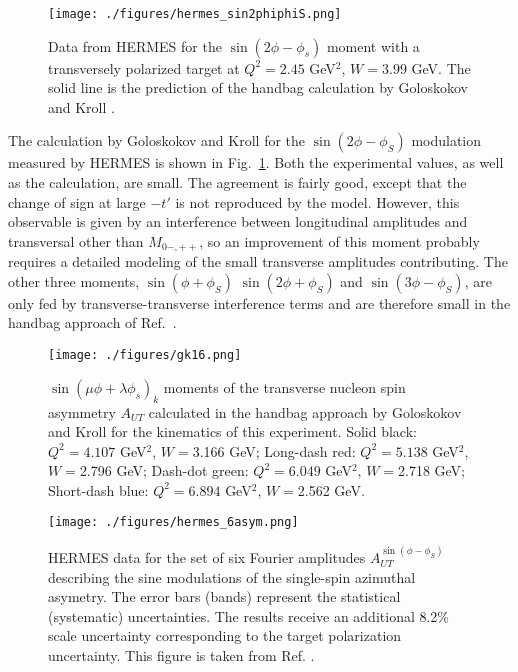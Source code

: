 \begin{figure}[hbt!]
\begin{center}
\texttt{[image: ./figures/hermes\_sin2phiphiS.png]}
\vspace*{-5mm}
\end{center}
\caption{\label{fig:hermes_sin2phiphiS}
\footnotesize{
Data from HERMES for the $\sin(2\phi-\phi_s)$ moment with a transversely
polarized target at $Q^2=2.45$ GeV$^2$, $W=3.99$ GeV.  The solid line is the
prediction of the handbag calculation by Goloskokov and Kroll
.}}
\end{figure}

The calculation by Goloskokov and Kroll \cite{Go10} for the
$\sin(2\phi-\phi_S)$ modulation measured by HERMES is shown in
Fig.~\ref{fig:hermes_sin2phiphiS}.  Both the experimental values, as well as
the calculation, are small.  The agreement is fairly good, except that the
change of sign at large $-t'$ is not reproduced by the model.  However, this
observable is given by an interference between longitudinal amplitudes and
transversal other than $M_{0-,++}$, so an improvement of this moment probably
requires a detailed modeling of the small transverse amplitudes contributing.
The other three moments, $\sin(\phi+\phi_S)$ $\sin(2\phi+\phi_S)$ and
$\sin(3\phi-\phi_S)$, are only fed by transverse-transverse interference terms
and are therefore small in the handbag approach of Ref.~\cite{Go10}.

\begin{figure}[htb!]
\begin{center}
\texttt{[image: ./figures/gk16.png]}
\caption{\label{fig:gk16}
\footnotesize{
$\sin(\mu\phi+\lambda\phi_s)_k$ moments of the transverse nucleon spin
  asymmetry $A_{UT}$ calculated in the handbag approach by Goloskokov and Kroll
  \cite{GoPC} for the kinematics of this experiment.
Solid black: $Q^2=4.107$ GeV$^2$, $W=$3.166 GeV;  
Long-dash red: $Q^2=5.138$ GeV$^2$, $W=$2.796 GeV;  
Dash-dot green: $Q^2=6.049$ GeV$^2$, $W=$2.718 GeV;  
Short-dash blue: $Q^2=6.894$ GeV$^2$, $W=$2.562 GeV.}}
\end{center}
\end{figure}

\begin{figure}[hbt!]
\begin{center}
\texttt{[image: ./figures/hermes\_6asym.png]}
\end{center}
\caption{\label{fig:hermes6}
\footnotesize{
HERMES data for the set of six Fourier amplitudes $A_{UT}^{\sin(\phi-\phi_S)}$
describing the sine modulations of the single-spin azimuthal asymetry.  The
error bars (bands) represent the statistical (systematic) uncertainties.  The
results receive an additional 8.2\% scale uncertainty corresponding to the
target polarization uncertainty.  This figure is taken from
Ref. .}}
\end{figure}

